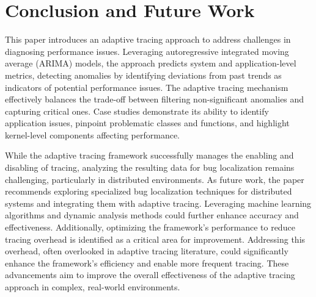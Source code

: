 \documentclass[pdflatex,sn-nature]{sn-jnl}%
\theoremstyle{thmstyleone}%
\theoremstyle{thmstyletwo}%
\theoremstyle{thmstylethree}%
\begin{document}
\section{Conclusion and Future Work}\label{conc}
This paper introduces an adaptive tracing approach to address challenges in diagnosing performance issues. Leveraging autoregressive integrated moving average (ARIMA) models, the approach predicts system and application-level metrics, detecting anomalies by identifying deviations from past trends as indicators of potential performance issues. The adaptive tracing mechanism effectively balances the trade-off between filtering non-significant anomalies and capturing critical ones. Case studies demonstrate its ability to identify application issues, pinpoint problematic classes and functions, and highlight kernel-level components affecting performance.

While the adaptive tracing framework successfully manages the enabling and disabling of tracing, analyzing the resulting data for bug localization remains challenging, particularly in distributed environments. As future work, the paper recommends exploring specialized bug localization techniques for distributed systems and integrating them with adaptive tracing. Leveraging machine learning algorithms and dynamic analysis methods could further enhance accuracy and effectiveness. Additionally, optimizing the framework's performance to reduce tracing overhead is identified as a critical area for improvement. Addressing this overhead, often overlooked in adaptive tracing literature, could significantly enhance the framework's efficiency and enable more frequent tracing. These advancements aim to improve the overall effectiveness of the adaptive tracing approach in complex, real-world environments.

\backmatter






\end{document}
